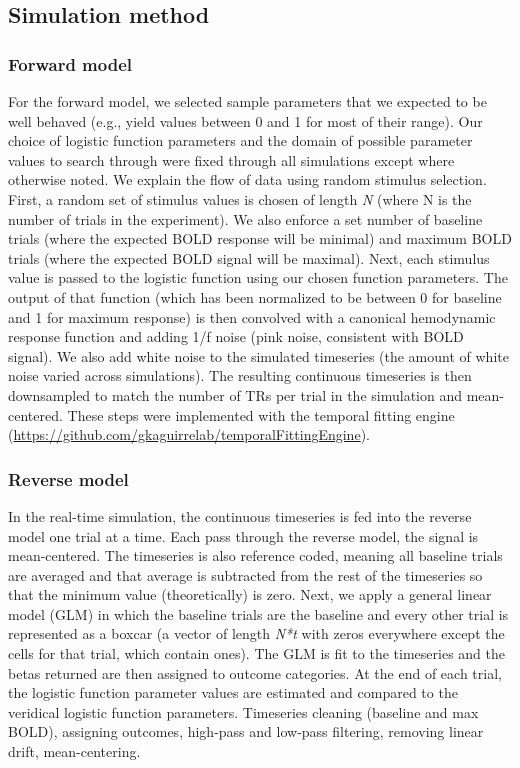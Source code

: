 \documentclass[
  english,
  man,floatsintext]{apa6}
\begin{document}
\hypertarget{simulation-method}{%
\subsection{Simulation method}\label{simulation-method}}

\hypertarget{forward-model}{%
\subsubsection{Forward model}\label{forward-model}}

For the forward model, we selected sample parameters that we expected to be well behaved (e.g., yield values between 0 and 1 for most of their range). Our choice of logistic function parameters and the domain of possible parameter values to search through were fixed through all simulations except where otherwise noted.
We explain the flow of data using random stimulus selection. First, a random set of stimulus values is chosen of length \emph{N} (where N is the number of trials in the experiment). We also enforce a set number of baseline trials (where the expected BOLD response will be minimal) and maximum BOLD trials (where the expected BOLD signal will be maximal). Next, each stimulus value is passed to the logistic function using our chosen function parameters. The output of that function (which has been normalized to be between 0 for baseline and 1 for maximum response) is then convolved with a canonical hemodynamic response function and adding 1/f noise (pink noise, consistent with BOLD signal). We also add white noise to the simulated timeseries (the amount of white noise varied across simulations). The resulting continuous timeseries is then downsampled to match the number of TRs per trial in the simulation and mean-centered. These steps were implemented with the temporal fitting engine (\url{https://github.com/gkaguirrelab/temporalFittingEngine}).

\hypertarget{reverse-model}{%
\subsubsection{Reverse model}\label{reverse-model}}

In the real-time simulation, the continuous timeseries is fed into the reverse model one trial at a time. Each pass through the reverse model, the signal is mean-centered. The timeseries is also reference coded, meaning all baseline trials are averaged and that average is subtracted from the rest of the timeseries so that the minimum value (theoretically) is zero. Next, we apply a general linear model (GLM) in which the baseline trials are the baseline and every other trial is represented as a boxcar (a vector of length \emph{N*t} with zeros everywhere except the cells for that trial, which contain ones). The GLM is fit to the timeseries and the betas returned are then assigned to outcome categories. At the end of each trial, the logistic function parameter values are estimated and compared to the veridical logistic function parameters.
Timeseries cleaning (baseline and max BOLD), assigning outcomes, high-pass and low-pass filtering, removing linear drift, mean-centering.
\end{document}
